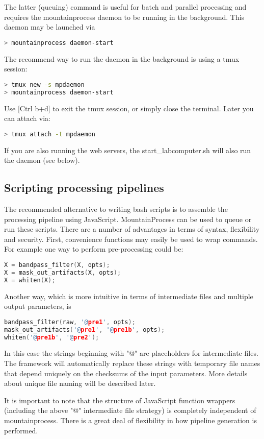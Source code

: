 \documentclass{article}
\begin{document}
The latter (queuing) command is useful for batch and parallel processing and requires the mountainprocess daemon to be running in the background. This daemon may be launched via
\begin{lstlisting}[language=bash]
> mountainprocess daemon-start
\end{lstlisting}
The recommend way to run the daemon in the background is using a tmux session:
\begin{lstlisting}[language=bash]
> tmux new -s mpdaemon
> mountainprocess daemon-start
\end{lstlisting}
Use [Ctrl b+d] to exit the tmux session, or simply close the terminal. Later you can attach via:
\begin{lstlisting}[language=bash]
> tmux attach -t mpdaemon
\end{lstlisting}
If you are also running the web servers, the start\_labcomputer.sh will also run the daemon (see below).

\subsection{Scripting processing pipelines}

The recommended alternative to writing bash scripts is to assemble the processing pipeline using JavaScript. MountainProcess can be used to queue or run these scripts. There are a number of advantages in terms of syntax, flexibility and security. First, convenience functions may easily be used to wrap commands. For example one way to perform pre-processing could be:
\begin{lstlisting}[language=C++]
X = bandpass_filter(X, opts);
X = mask_out_artifacts(X, opts);
X = whiten(X);
\end{lstlisting}

Another way, which is more intuitive in terms of intermediate files and multiple output parameters, is
\begin{lstlisting}[language=C++]
bandpass_filter(raw, '@pre1', opts);
mask_out_artifacts('@pre1', '@pre1b', opts);
whiten('@pre1b', '@pre2');
\end{lstlisting}
In this case the strings beginning with "@" are placeholders for intermediate files. The framework will automatically replace these strings with temporary file names that depend uniquely on the checksums of the input parameters. More details about unique file naming will be described later.

It is important to note that the structure of JavaScript function wrappers (including the above "@" intermediate file strategy) is completely independent of mountainprocess. There is a great deal of flexibility in how pipeline generation is performed.
\end{document}
